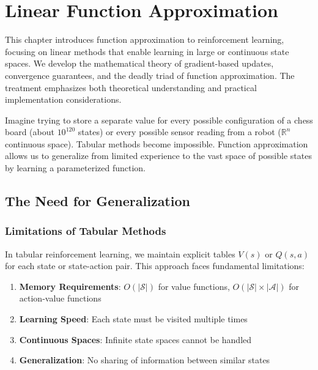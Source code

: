 \chapter{Linear Function Approximation}
\label{ch:linear-function-approximation}

\begin{keyideabox}
This chapter introduces function approximation to reinforcement learning, focusing on linear methods that enable learning in large or continuous state spaces. We develop the mathematical theory of gradient-based updates, convergence guarantees, and the deadly triad of function approximation. The treatment emphasizes both theoretical understanding and practical implementation considerations.
\end{keyideabox}

\begin{intuitionbox}
Imagine trying to store a separate value for every possible configuration of a chess board (about $10^{120}$ states) or every possible sensor reading from a robot ($\mathbb{R}^n$ continuous space). Tabular methods become impossible. Function approximation allows us to generalize from limited experience to the vast space of possible states by learning a parameterized function.
\end{intuitionbox}

\section{The Need for Generalization}

\subsection{Limitations of Tabular Methods}

In tabular reinforcement learning, we maintain explicit tables $V(s)$ or $Q(s,a)$ for each state or state-action pair. This approach faces fundamental limitations:

\begin{enumerate}
\item \textbf{Memory Requirements}: $O(|\mathcal{S}|)$ for value functions, $O(|\mathcal{S}| \times |\mathcal{A}|)$ for action-value functions
\item \textbf{Learning Speed}: Each state must be visited multiple times
\item \textbf{Continuous Spaces}: Infinite state spaces cannot be handled
\item \textbf{Generalization}: No sharing of information between similar states
\end{enumerate}

